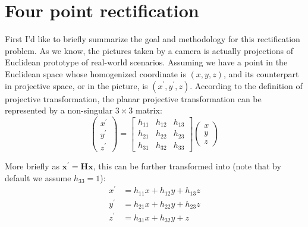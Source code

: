 \documentclass[conference]{IEEEtran}
\newcommand{\mat}[1]{\mathbf{#1}} %
\begin{document}





%
\IEEEpeerreviewmaketitle



\section{Four point rectification}
First I'd like to briefly summarize the goal and methodology for this rectification problem. As we know, the pictures taken by a camera is actually projections of Euclidean prototype of real-world scenarios. Assuming we have a point in the Euclidean space whose homogenized coordinate is $(x, y, z)$, and its counterpart in projective space, or in the picture, is $(x^\prime , y^\prime , z)$. According to the definition of projective transformation, the planar projective transformation can be represented by a non-singular $3\times 3$ matrix:
\begin{equation}
	\begin{pmatrix}
		x^\prime \\
		y^\prime \\
		z^\prime 
	\end{pmatrix}
	=
	\begin{bmatrix}
		h_{11} & h_{12} & h_{13}\\
		h_{21} & h_{22} & h_{23}\\
		h_{31} &  h_{32} & h_{33}
	\end{bmatrix}
	\begin{pmatrix}
		x\\
		y\\
		z
	\end{pmatrix}
\end{equation}

\noindent More briefly as $\mat{x^\prime} = \mat{H} \mat{x}$, this can be further transformed into (note that by default we assume $h_{33} = 1$):
\begin{equation}
	\begin{split}
		x^\prime &= h_{11}x + h_{12}y + h_{13}z\\
		y^\prime &= h_{21}x + h_{22}y + h_{23}z\\
		z^\prime &= h_{31}x + h_{32}y + z
	\end{split}
\end{equation}
\end{document}
